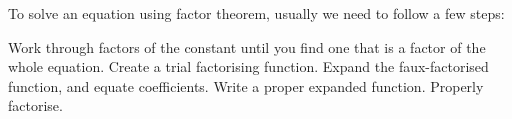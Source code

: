 To solve an equation using factor theorem, usually we need to follow a few steps:
\begin{enumerate}
	\ii Work through factors of the constant until you find one that is a factor of the whole equation.
	\ii Create a trial factorising function.
	\ii Expand the faux-factorised function, and equate coefficients.
	\ii Write a proper expanded function.
	\ii Properly factorise.
\end{enumerate}

